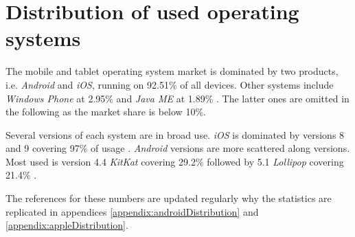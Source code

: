 \section{Distribution of used operating systems}\label{preStudy:devices}

The mobile and tablet operating system market is dominated by two products, i.e. \textit{Android} and \textit{iOS}, running on 92.51\% of all devices. 
Other systems include \textit{Windows Phone} at 2.95\% and \textit{Java ME} at 1.89\% \citep{preStudy:devices:companies}.
The latter ones are omitted in the following as the market share is below 10\%.

Several versions of each system are in broad use.
\textit{iOS} is dominated by versions 8 and 9 covering 97\% of usage \citep{preStudy:devices:apple}.
\textit{Android} versions are more scattered along versions. 
Most used is version 4.4 \textit{KitKat} covering 29.2\% followed by 5.1 \textit{Lollipop} covering 21.4\% \citep{preStudy:devices:android}.

The references for these numbers are updated regularly why the statistics are replicated in appendices \ref{appendix:androidDistribution} and \ref{appendix:appleDistribution}.
